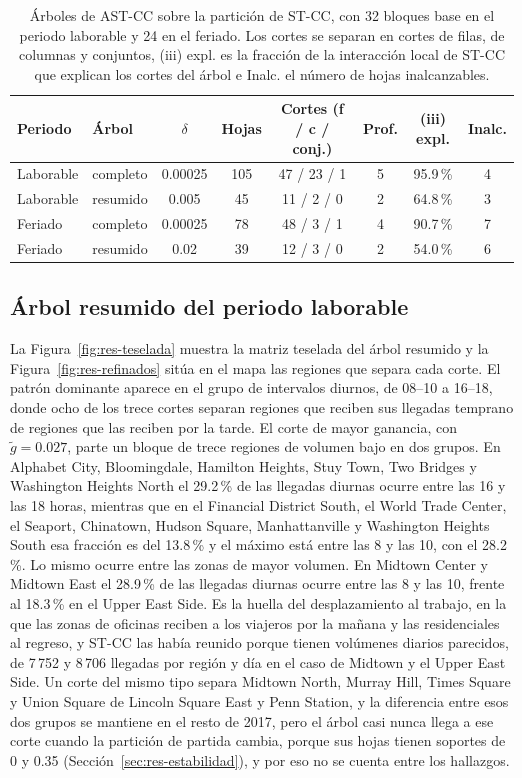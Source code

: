 \begin{table}[t]
\centering
\small
\begin{tabular}{@{}llcccccc@{}}
\toprule
Periodo & Árbol & $\delta$ & Hojas & Cortes (f / c / conj.) & Prof. & (iii) expl. & Inalc. \\
\midrule
Laborable & completo & 0.00025 & 105 & 47 / 23 / 1 & 5 & 95.9\,\% & 4 \\
Laborable & resumido & 0.005   & 45  & 11 / 2 / 0  & 2 & 64.8\,\% & 3 \\
Feriado   & completo & 0.00025 & 78  & 48 / 3 / 1  & 4 & 90.7\,\% & 7 \\
Feriado   & resumido & 0.02    & 39  & 12 / 3 / 0  & 2 & 54.0\,\% & 6 \\
\bottomrule
\end{tabular}
\caption{Árboles de AST-CC sobre la partición de ST-CC, con 32 bloques base en
el periodo laborable y 24 en el feriado. Los cortes se separan en cortes de filas,
de columnas y conjuntos, (iii) expl. es la fracción de la interacción local de
ST-CC que explican los cortes del árbol e Inalc. el número de hojas inalcanzables.}
\label{tab:res-arboles}
\end{table}

\subsection{Árbol resumido del periodo laborable}

La Figura~\ref{fig:res-teselada} muestra la matriz teselada del árbol resumido y
la Figura~\ref{fig:res-refinados} sitúa en el mapa las regiones que separa cada
corte. El patrón dominante aparece en el grupo de intervalos diurnos, de 08--10 a
16--18, donde ocho de los trece cortes separan regiones que reciben sus llegadas
temprano de regiones que las reciben por la tarde. El corte de mayor ganancia, con
$\tilde g = 0.027$, parte un bloque de trece regiones de volumen bajo en dos
grupos. En Alphabet City, Bloomingdale, Hamilton Heights, Stuy Town, Two Bridges y
Washington Heights North el 29.2\,\% de las llegadas diurnas ocurre entre las 16 y
las 18 horas, mientras que en el Financial District South, el World Trade Center,
el Seaport, Chinatown, Hudson Square, Manhattanville y Washington Heights South
esa fracción es del 13.8\,\% y el máximo está entre las 8 y las 10, con el
28.2\,\%. Lo mismo ocurre entre las zonas de mayor volumen. En Midtown Center y
Midtown East el 28.9\,\% de las llegadas diurnas ocurre entre las 8 y las 10,
frente al 18.3\,\% en el Upper East Side. Es la huella del desplazamiento al
trabajo, en la que las zonas de oficinas reciben a los viajeros por la mañana y
las residenciales al regreso, y ST-CC las había reunido porque tienen volúmenes
diarios parecidos, de 7\,752 y 8\,706 llegadas por región y día en el caso de
Midtown y el Upper East Side. Un corte del mismo tipo separa Midtown North, Murray
Hill, Times Square y Union Square de Lincoln Square East y Penn Station, y la
diferencia entre esos dos grupos se mantiene en el resto de 2017, pero el árbol
casi nunca llega a ese corte cuando la partición de partida cambia, porque sus
hojas tienen soportes de 0 y 0.35 (Sección~\ref{sec:res-estabilidad}), y por eso
no se cuenta entre los hallazgos.

